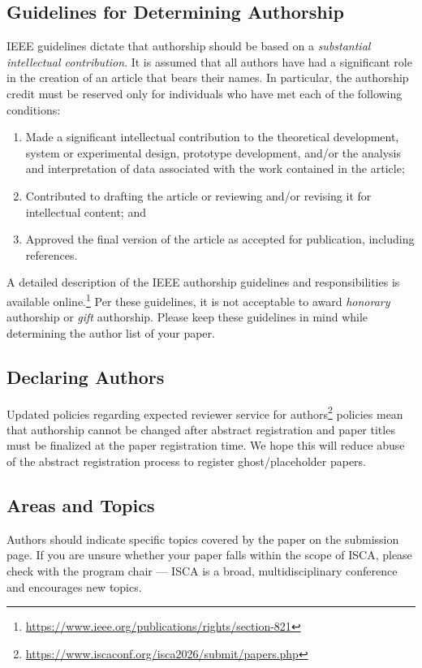 \documentclass[conference]{IEEEtran}
\begin{document}
\subsection{Guidelines for Determining Authorship}
IEEE guidelines dictate that authorship should be based on a {\em
  substantial intellectual contribution}. It is assumed that all
authors have had a significant role in the creation of an article that
bears their names. In particular, the authorship credit must be
reserved only for individuals who have met each of the following
conditions:

\begin{enumerate}
\item Made a significant intellectual contribution to the theoretical
  development, system or experimental design, prototype development,
  and/or the analysis and interpretation of data associated with the
  work contained in the article;

\item Contributed to drafting the article or reviewing and/or revising
  it for intellectual content; and

\item Approved the final version of the article as accepted for publication, including references.
\end{enumerate}

A detailed description of the IEEE authorship guidelines and
responsibilities is available online.\footnote{\url{https://www.ieee.org/publications/rights/section-821}} Per
these guidelines, it is not acceptable to award {\em honorary}
authorship or {\em gift} authorship. Please keep these guidelines in
mind while determining the author list of your paper.

\subsection{Declaring Authors}
 Updated policies regarding expected reviewer service for authors\footnote{\url{https://www.iscaconf.org/isca2026/submit/papers.php}} policies mean that authorship cannot be changed after abstract registration and paper titles must be finalized at the paper registration time. We hope this will reduce abuse of the abstract registration process to register ghost/placeholder papers.


\subsection{Areas and Topics}
Authors should indicate specific topics covered by the paper on the
submission page. If you are unsure whether your paper falls within the
scope of ISCA, please check with the program chair --- ISCA is a broad,
multidisciplinary conference and encourages new topics.
\end{document}
